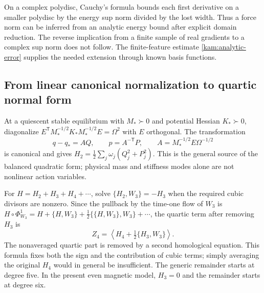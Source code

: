 On a complex polydisc, Cauchy's formula bounds each first derivative on a smaller polydisc by the energy sup norm divided by the lost width. Thus a force norm can be inferred from an analytic energy bound after explicit domain reduction. The reverse implication from a finite sample of real gradients to a complex sup norm does not follow. The finite-feature estimate \eqref{kam:analytic-error} supplies the needed extension through known basis functions.

\subsection{From linear canonical normalization to quartic normal form}
\label{ss:normalform}

At a quiescent stable equilibrium with $M_*\succ0$ and potential Hessian $K_*\succ0$, diagonalize
$E^{\mathsf T}M_*^{-1/2}K_*M_*^{-1/2}E=\Omega^2$ with $E$ orthogonal. The transformation
\[
 q-q_*=A Q,\qquad p=A^{-\mathsf T}P,
 \qquad A=M_*^{-1/2}E\Omega^{-1/2}
\]
is canonical and gives $H_2=\tfrac12\sum_j\omega_j(Q_j^2+P_j^2)$. This is the general source of the balanced quadratic form; physical mass and stiffness modes alone are not nonlinear action variables.

For $H=H_2+H_3+H_4+\cdots$, solve
$\{H_2,W_3\}=-H_3$ when the required cubic divisors are nonzero. Since the pullback by the time-one flow of $W_3$ is
$H\circ\Phi_{W_3}^1=H+\{H,W_3\}+\tfrac12\{\{H,W_3\},W_3\}+\cdots$,
the quartic term after removing $H_3$ is
\begin{equation}\label{ss:cubic-correction}
 Z_4=\left\langle H_4+\tfrac12\{H_3,W_3\}\right\rangle.
\end{equation}
The nonaveraged quartic part is removed by a second homological equation. This formula fixes both the sign and the contribution of cubic terms; simply averaging the original $H_4$ would in general be insufficient. The generic remainder starts at degree five. In the present even magnetic model, $H_3=0$ and the remainder starts at degree six.

